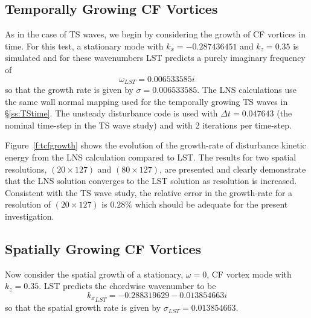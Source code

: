 \subsection{Temporally Growing CF Vortices \label{ss:CFtime} }

As in the case of TS waves, we begin by considering the growth of CF vortices
in time.  For this test, a stationary mode with $k_x=-0.287436451$ and
$k_z=0.35$ is simulated and for these wavenumbers LST predicts a purely
imaginary frequency of
%
%
%
%
%
\begin{equation}
  \omega_{LST} = 0.006533585 i
\end{equation}
%
so that the growth rate is given by $\sigma = 0.006533585$.  The LNS
calculations use the same wall normal mapping used for the temporally growing
TS waves in \S\ref{ss:TStime}.  The unsteady disturbance code is used with
$\Delta t = 0.047643$ (the nominal time-step in the TS wave study) and with 2
iterations per time-step.

Figure~\ref{f:tcfgrowth} shows the evolution of the growth-rate of disturbance
kinetic energy from the LNS calculation compared to LST.  The results for two
spatial resolutions, $(20 \times 127)$ and $(80 \times 127)$, are presented
and clearly demonstrate that the LNS solution converges to the LST solution as
resolution is increased. Consistent with the TS wave study, the relative error
in the growth-rate for a resolution of $(20 \times 127)$ is $0.28\%$ which
should be adequate for the present investigation.

\subsection{Spatially Growing CF Vortices \label{ss:CFspace} }

Now consider the spatial growth of a stationary, $\omega=0$, CF vortex mode
with $k_z = 0.35$.  LST predicts the chordwise wavenumber to be
%
%
%
%
%
%
\begin{equation}
  {k_x}_{LST} = -0.288319629 - 0.013854663 i
\end{equation}
%
so that the spatial growth rate is given by $\sigma_{LST} = 0.013854663$.

